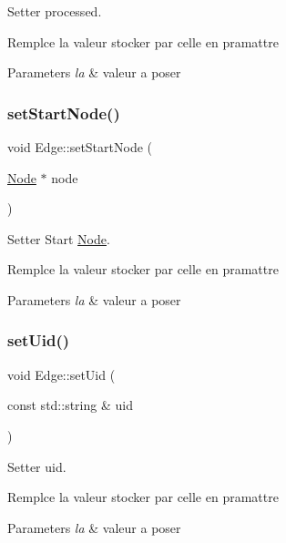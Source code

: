 Setter processed. 

Remplce la valeur stocker par celle en pramattre


\begin{DoxyParams}{Parameters}
{\em la} & valeur a poser \\
\hline
\end{DoxyParams}
\mbox{\label{class_edge_a4a63f185bbe9f712381da62cdc3e33cc}} 
\subsubsection{\texorpdfstring{set\+Start\+Node()}{setStartNode()}}
{\footnotesize\ttfamily void Edge\+::set\+Start\+Node (\begin{DoxyParamCaption}\item[{\mbox{\hyperlink{class_node}{Node}} $\ast$}]{node }\end{DoxyParamCaption})}



Setter Start \mbox{\hyperlink{class_node}{Node}}. 

Remplce la valeur stocker par celle en pramattre


\begin{DoxyParams}{Parameters}
{\em la} & valeur a poser \\
\hline
\end{DoxyParams}
\mbox{\label{class_edge_a40842cb5908a28634da71ec1cabea963}} 
\subsubsection{\texorpdfstring{set\+Uid()}{setUid()}}
{\footnotesize\ttfamily void Edge\+::set\+Uid (\begin{DoxyParamCaption}\item[{const std\+::string \&}]{uid }\end{DoxyParamCaption})}



Setter uid. 

Remplce la valeur stocker par celle en pramattre


\begin{DoxyParams}{Parameters}
{\em la} & valeur a poser \\
\hline
\end{DoxyParams}
\mbox{\label{class_edge_af784390543c16f8ce3b5297f3adfcc10}} 

